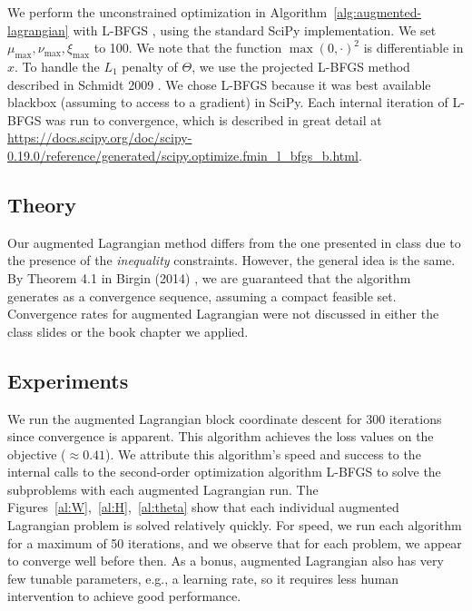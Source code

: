 \documentclass{article}
\newcommand{\0}{\mathrm{0}}
\newcommand{\1}{\mathrm{1}}
\begin{document}
We perform the unconstrained optimization in
Algorithm~\ref{alg:augmented-lagrangian} with L-BFGS
\cite{liu1989limited}, using the standard SciPy implementation. We set $\mu_\text{max}, \nu_\text{max}, \xi_\text{max}$ to 100. We
note that the function $\max(0, \cdot)^2$ is differentiable in $x$. To
handle the $L_1$ penalty of $\Theta$, we use the projected L-BFGS
method described in Schmidt 2009 \cite{schmidt2009optimization}.  We chose
L-BFGS because it was best available blackbox (assuming to access to a
gradient) in SciPy. Each internal iteration of L-BFGS was run to convergence,
which is described in  great detail at \url{https://docs.scipy.org/doc/scipy-0.19.0/reference/generated/scipy.optimize.fmin_l_bfgs_b.html}.

\subsection{Theory}
Our augmented Lagrangian method differs from the one presented in
class due to the presence of the {\em inequality}
constraints. However, the general idea is the same. By Theorem 4.1 in
Birgin (2014) \cite{birgin2014practical}, we are guaranteed that the algorithm
generates as a convergence sequence, assuming a compact
feasible set. Convergence rates for augmented Lagrangian were not discussed in either the class slides
or the book chapter we applied.


\subsection{Experiments}
We run the augmented Lagrangian block coordinate descent for 300 iterations since convergence is apparent.
This algorithm achieves the loss values on the objective ($\approx 0.41$). We attribute this algorithm's speed
and success to the internal calls to the second-order optimization algorithm L-BFGS to solve the subproblems
with each augmented Lagrangian run. The Figures~\ref{al:W},~\ref{al:H},~\ref{al:theta} show that each individual
augmented Lagrangian problem is solved relatively quickly. For speed, we run each algorithm for a maximum of 50 iterations,
and we observe that for each problem, we appear to converge well before then. As a bonus, augmented Lagrangian
also has very few tunable parameters, e.g., a learning rate, so it requires less human intervention to achieve good performance.
\end{document}
